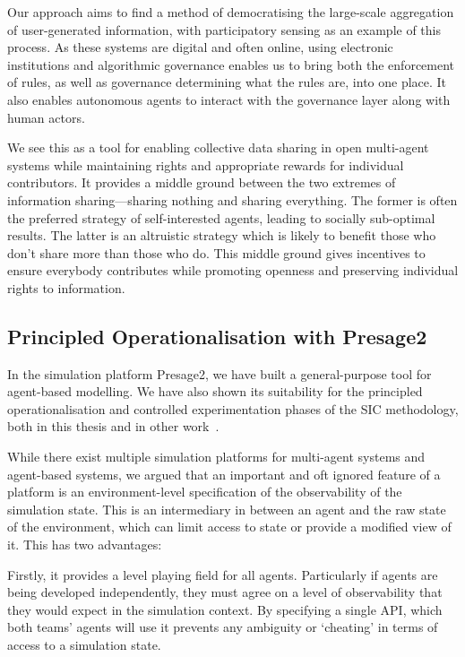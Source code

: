 Our approach aims to find a method of democratising the large-scale
aggregation of user-generated information, with participatory sensing as an
example of this process. As these systems are digital and often online, using
electronic institutions and algorithmic governance enables us to bring both
the enforcement of rules, as well as governance determining what the rules
are, into one place. It also enables autonomous agents to interact with the
governance layer along with human actors.

We see this as a tool for enabling collective data sharing in open multi-agent
systems while maintaining rights and appropriate rewards for individual
contributors. It provides a middle ground between the two extremes of
information sharing---sharing nothing and sharing everything. The former is
often the preferred strategy of self-interested agents, leading to socially
sub-optimal results. The latter is an altruistic strategy which is likely to
benefit those who don't share more than those who do. This middle ground gives
incentives to ensure everybody contributes while promoting openness and preserving individual rights to information.

\subsection{Principled Operationalisation with Presage2}

In the simulation platform Presage2, we have built a general-purpose tool for
agent-based modelling. We have also shown its suitability for the
principled operationalisation and controlled experimentation phases of the
\ac{SIC} methodology, both in this thesis and in other
work~\citep{Macbeth2014}.

While there exist multiple simulation platforms for multi-agent systems and
agent-based systems, we argued that an important and oft ignored feature of
a platform is an environment-level specification of the observability of the
simulation state. This is an intermediary in between an agent and the raw
state of the environment, which can limit access to state or provide a modified view of it.
This has two advantages:

Firstly, it provides a level playing field for all agents. Particularly if
agents are being developed independently, they must agree on a level of
observability that they would expect in the simulation context. By specifying a
single \ac{API}, which both teams' agents will use it prevents any ambiguity
or `cheating' in terms of access to a simulation state.

